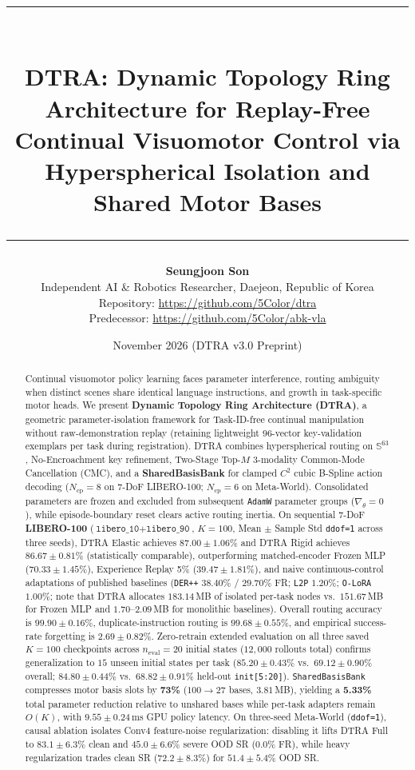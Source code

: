 \documentclass[10pt]{article}
\title{\vspace{-2.3em}\rule{\linewidth}{2pt}\\[0.32em]\textbf{DTRA: Dynamic Topology Ring Architecture for Replay-Free Continual Visuomotor Control via Hyperspherical Isolation and Shared Motor Bases}\\[0.25em]\rule{\linewidth}{0.8pt}\vspace{-0.85em}}
\author{
  \textbf{Seungjoon Son}\\
  Independent AI \& Robotics Researcher, Daejeon, Republic of Korea\\
  Repository: \url{https://github.com/5Color/dtra}\\
  Predecessor: \url{https://github.com/5Color/abk-vla}
}
\date{November 2026 (DTRA v3.0 Preprint)}
\begin{document}
\maketitle

\begin{abstract}
Continual visuomotor policy learning faces parameter interference, routing ambiguity when distinct scenes share identical language instructions, and growth in task-specific motor heads. We present \textbf{Dynamic Topology Ring Architecture (DTRA)}, a geometric parameter-isolation framework for Task-ID-free continual manipulation without raw-demonstration replay (retaining lightweight 96-vector key-validation exemplars per task during registration). DTRA combines hyperspherical routing on $\mathbb{S}^{63}$, No-Encroachment key refinement, Two-Stage Top-$M$ 3-modality Common-Mode Cancellation (CMC), and a \textbf{SharedBasisBank} for clamped $C^2$ cubic B-Spline action decoding ($N_{\text{cp}}=8$ on 7-DoF LIBERO-100; $N_{\text{cp}}=6$ on Meta-World). Consolidated parameters are frozen and excluded from subsequent \texttt{AdamW} parameter groups ($\nabla_\theta=0$), while episode-boundary reset clears active routing inertia. On sequential 7-DoF \textbf{LIBERO-100} ($\texttt{libero\_10}+\texttt{libero\_90}$, $K=100$, Mean $\pm$ Sample Std \texttt{ddof=1} across three seeds), DTRA Elastic achieves $\mathbf{87.00 \pm 1.06}$\% and DTRA Rigid achieves $86.67 \pm 0.81$\% (statistically comparable), outperforming matched-encoder Frozen MLP ($70.33 \pm 1.45$\%), Experience Replay 5\% ($39.47 \pm 1.81$\%), and naive continuous-control adaptations of published baselines (\texttt{DER++} $38.40\%$ / $29.70\%$ FR; \texttt{L2P} $1.20\%$; \texttt{O-LoRA} $1.00\%$; note that DTRA allocates $183.14\,$MB of isolated per-task nodes vs.\ $151.67\,$MB for Frozen MLP and $1.70\text{--}2.09\,$MB for monolithic baselines). Overall routing accuracy is $99.90 \pm 0.16$\%, duplicate-instruction routing is $\mathbf{99.68 \pm 0.55}$\%, and empirical success-rate forgetting is $2.69 \pm 0.82$\%. Zero-retrain extended evaluation on all three saved $K=100$ checkpoints across $n_{\text{eval}}=20$ initial states ($12{,}000$ rollouts total) confirms generalization to $15$ unseen initial states per task ($\mathbf{85.20 \pm 0.43}\%$ vs.\ $69.12 \pm 0.90\%$ overall; $\mathbf{84.80 \pm 0.44}\%$ vs.\ $68.82 \pm 0.91\%$ held-out \texttt{init[5:20]}). \texttt{SharedBasisBank} compresses motor basis slots by \textbf{73\%} ($100 \to 27$ bases, $3.81\,$MB), yielding a \textbf{5.33\%} total parameter reduction relative to unshared bases while per-task adapters remain $O(K)$, with $9.55 \pm 0.24$\,ms GPU policy latency. On three-seed Meta-World (\texttt{ddof=1}), causal ablation isolates Conv4 feature-noise regularization: disabling it lifts DTRA Full to $\mathbf{83.1 \pm 6.3}\%$ clean and $\mathbf{45.0 \pm 6.6}\%$ severe OOD SR ($0.0\%$ FR), while heavy regularization trades clean SR ($72.2 \pm 8.3\%$) for $51.4 \pm 5.4\%$ OOD SR.
\end{abstract}
\end{document}
